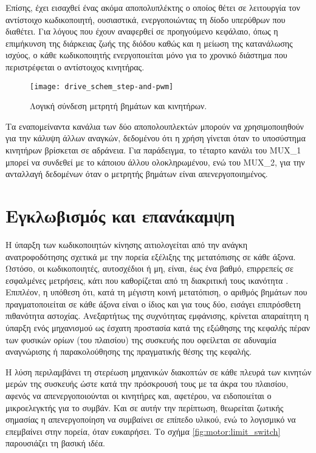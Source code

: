 Επίσης, έχει εισαχθεί ένας ακόμα αποπολυπλέκτης ο οποίος θέτει σε λειτουργία
τον αντίστοιχο κωδικοποιητή, ουσιαστικά, ενεργοποιώντας τη δίοδο υπερύθρων που
διαθέτει. Για λόγους που έχουν αναφερθεί σε προηγούμενο κεφάλαιο, όπως η
επιμήκυνση της διάρκειας ζωής της διόδου καθώς και η μείωση της κατανάλωσης
ισχύος, ο κάθε κωδικοποιητής ενεργοποιείται μόνο για το χρονικό διάστημα που
περιστρέφεται ο αντίστοιχος κινητήρας.

\begin{figure}
    \caption{Λογική σύνδεση μετρητή βημάτων και κινητήρων.
    \label{fig:motor:route_steps}}
    \begin{center}
    \texttt{[image: drive\_schem\_step-and-pwm]}
    \end{center}
\end{figure}

Τα εναπομείναντα κανάλια των δύο αποπολουπλεκτών μπορούν να χρησιμοποιηθούν για
την κάλυψη άλλων αναγκών, δεδομένου ότι η χρήση γίνεται όταν το υποσύστημα
κινητήρων βρίσκεται σε αδράνεια. Για παράδειγμα, το τέταρτο κανάλι του MUX\_1
μπορεί να συνδεθεί με το  κάποιου άλλου ολοκληρωμένου, ενώ του MUX\_2,
για την ανταλλαγή δεδομένων όταν ο μετρητής βημάτων είναι απενεργοποιημένος.


\section{Εγκλωβισμός και επανάκαμψη}
\label{sec:motor:backtrack}

Η ύπαρξη των κωδικοποιητών κίνησης αιτιολογείται από την ανάγκη ανατροφοδότησης
σχετικά με την πορεία εξέλιξης της μετατόπισης σε κάθε άξονα. Ωστόσο, οι
κωδικοποιητές, αυτοσχέδιοι ή μη, είναι, έως ένα βαθμό, επιρρεπείς σε εσφαλμένες
μετρήσεις, κάτι που καθορίζεται από τη διακριτική τους ικανότητα
\parencite[15--16]{albert11}. Επιπλέον, η υπόθεση ότι, κατά τη μέγιστη κοινή
μετατόπιση, ο αριθμός βημάτων που πραγματοποιείται σε κάθε άξονα είναι ο ίδιος
και για τους δύο, εισάγει επιπρόσθετη πιθανότητα αστοχίας. Ανεξαρτήτως της
συχνότητας εμφάνισης, κρίνεται απαραίτητη η ύπαρξη ενός μηχανισμού ως έσχατη
προστασία κατά της εξώθησης της κεφαλής πέραν των φυσικών ορίων (του πλαισίου)
της συσκευής που οφείλεται σε αδυναμία αναγνώρισης ή παρακολούθησης της
πραγματικής θέσης της κεφαλής.

Η λύση περιλαμβάνει τη στερέωση μηχανικών διακοπτών σε κάθε πλευρά των κινητών
μερών της συσκευής ώστε κατά την πρόσκρουσή τους με τα άκρα του πλαισίου, αφενός
να απενεργοποιούνται οι κινητήρες και, αφετέρου, να ειδοποιείται ο μικροελεγκτής
για το συμβάν. Και σε αυτήν την περίπτωση, θεωρείται ζωτικής σημασίας η
απενεργοποίηση να συμβαίνει σε επίπεδο υλικού, ενώ το λογισμικό να επεμβαίνει
στην πορεία, όταν ευκαιρήσει. Το σχήμα \ref{fig:motor:limit_switch} παρουσιάζει
τη βασική ιδέα.

